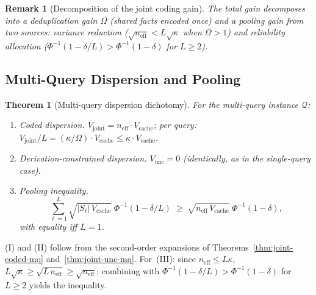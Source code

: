 \documentclass[journal]{IEEEtran}
\makeatletter
\newtheorem{theorem}{Theorem}[section]
\newtheorem{remark}{Remark}[section]
\numberwithin{equation}{section}
\renewenvironment{proof}[1][\proofname]{\par
  \pushQED{\qed}%
  \normalfont \topsep6\p@\@plus6\p@\relax
  \trivlist
  \item[\hskip\labelsep
        \itshape
    #1\@addpunct{.}]\ignorespaces
}{%
  \popQED\endtrivlist\@endpefalse
}
\makeatother
\begin{document}
\begin{remark}[Decomposition of the joint coding gain]
\label{rem:gain-decomp-mq}
The total gain decomposes into a \emph{deduplication gain}
$\Omega$ (shared facts encoded once) and a \emph{pooling
gain} from two sources: variance reduction
($\sqrt{n_{\mathrm{eff}}}<L\sqrt\kappa$ when $\Omega>1$)
and reliability allocation
($\Phi^{-1}(1{-}\delta/L)>\Phi^{-1}(1{-}\delta)$ for
$L\ge 2$).
\end{remark}

\subsection{Multi-Query Dispersion and Pooling}
\label{subsec:mq-dispersion}

\begin{theorem}[Multi-query dispersion dichotomy]
\label{thm:multi-dispersion-mq}
For the multi-query instance $\mathcal Q$:
\begin{enumerate}[label=\textup{(\Roman*)}]
\item \emph{Coded dispersion.}\;
$V_{\mathrm{joint}}
=n_{\mathrm{eff}}\cdot V_{\mathrm{cache}}$;
per query:
$V_{\mathrm{joint}}/L
=(\kappa/\Omega)\cdot V_{\mathrm{cache}}
\le\kappa\cdot V_{\mathrm{cache}}$.

\item \emph{Derivation-constrained dispersion.}\;
$V_{\mathrm{unc}}=0$ \textup{(}identically, as in the
single-query case\textup{)}.

\item \emph{Pooling inequality.}\;
\begin{equation}\label{eq:pooling-ineq-mq}
  \sum_{\ell=1}^L
  \sqrt{|S_\ell|\,V_{\mathrm{cache}}}\;
    \Phi^{-1}(1{-}\delta/L)
  \;\ge\;
  \sqrt{n_{\mathrm{eff}}\,V_{\mathrm{cache}}}\;
    \Phi^{-1}(1{-}\delta),
\end{equation}
with equality iff $L=1$.
\end{enumerate}
\end{theorem}

\begin{proof}
(I) and (II) follow from the second-order expansions of
Theorems~\ref{thm:joint-coded-mq}
and~\ref{thm:joint-unc-mq}.
For~(III): since $n_{\mathrm{eff}}\le L\kappa$,
$L\sqrt\kappa\ge\sqrt{L\,n_{\mathrm{eff}}}
\ge\sqrt{n_{\mathrm{eff}}}$; combining with
$\Phi^{-1}(1{-}\delta/L)>\Phi^{-1}(1{-}\delta)$ for
$L\ge 2$ yields the inequality.
\end{proof}
\end{document}
